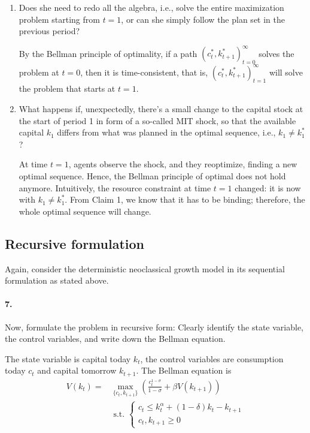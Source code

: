 \documentclass[dvipsnames,11pt]{article}
\begin{document}
\begin{enumerate}
    \item [a.] Does she need to redo all the algebra, i.e., solve the entire maximization problem starting from $t = 1$, or can she simply follow the plan set in the previous period? 
    
\begin{solution}
     By the Bellman principle of optimality, if a path $(c_t^*,k_{t+1}^*)_{t=0}^\infty$ solves the problem at $t=0$, then it is time-consistent, that is,   $(c_t^*,k_{t+1}^*)_{t=1}^\infty$ will solve the problem that starts at $t=1$.                   
\end{solution}

                        
    \item [b.] What happens if, unexpectedly, there's a small change to the capital stock at the start of period 1 in form of a so-called MIT shock, so that the available capital $k_1$ differs from what was planned in the optimal sequence, i.e., $k_1 \neq k_1^*$?

                        \begin{solution}
At time $t=1$, agents observe the shock, and they reoptimize, finding a new optimal sequence. Hence, the Bellman principle of optimal does not hold anymore. Intuitively, the resource constraint at time $t=1$ changed: it is now with $k_1 \neq k_1^*$. From Claim 1, we know that it has to be binding; therefore, the whole optimal sequence will change. 
                        \end{solution}
\end{enumerate}

\subsection{Recursive formulation}

Again, consider the deterministic neoclassical growth model in its sequential formulation as stated above.


\paragraph{7. } Now, formulate the problem in recursive form: Clearly identify the state variable, the control variables, and write down the Bellman equation.

                \begin{solution}
The state variable is capital today $k_t$, the control variables are consumption today $c_t$ and capital tomorrow $k_{t+1}$. The Bellman equation is 
\begin{align*}
V(k_t)=&\max_{\{c_t,k_{t+1}\}}\left(\frac{c_t^{1-\sigma}}{1-\sigma}+\beta V(k_{t+1})\right) \\&\text{ s.t. } \begin{cases} c_t \leq k_t^\alpha+(1-\delta)k_t-k_{t+1} \\ c_t,k_{t+1} \geq 0
\end{cases}
\end{align*}
                    
                    
                \end{solution}
            
\end{document}
